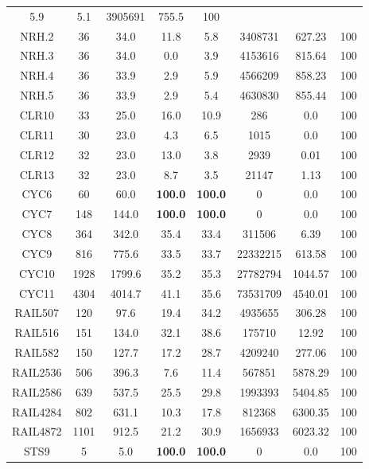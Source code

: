 \begin{longtable}{@{\extracolsep{5pt}}cccccccc}
			5.9
		&
			5.1
		& 3905691 & 755.5 & 100
	\\
	NRH.2 &
		36 & 34.0 &
			11.8
		&
			5.8
		& 3408731 & 627.23 & 100
	\\
	NRH.3 &
		36 & 34.0 &
			0.0
		&
			3.9
		& 4153616 & 815.64 & 100
	\\
	NRH.4 &
		36 & 33.9 &
			2.9
		&
			5.9
		& 4566209 & 858.23 & 100
	\\
	NRH.5 &
		36 & 33.9 &
			2.9
		&
			5.4
		& 4630830 & 855.44 & 100
	\\
	CLR10 &
		33 & 25.0 &
			16.0
		&
			10.9
		& 286 & 0.0 & 100
	\\
	CLR11 &
		30 & 23.0 &
			4.3
		&
			6.5
		& 1015 & 0.0 & 100
	\\
	CLR12 &
		32 & 23.0 &
			13.0
		&
			3.8
		& 2939 & 0.01 & 100
	\\
	CLR13 &
		32 & 23.0 &
			8.7
		&
			3.5
		& 21147 & 1.13 & 100
	\\
	CYC6 &
		60 & 60.0 &
			\textbf{100.0}
		&
			\textbf{100.0}
		& 0 & 0.0 & 100
	\\
	CYC7 &
		148 & 144.0 &
			\textbf{100.0}
		&
			\textbf{100.0}
		& 0 & 0.0 & 100
	\\
	CYC8 &
		364 & 342.0 &
			35.4
		&
			33.4
		& 311506 & 6.39 & 100
	\\
	CYC9 &
		816 & 775.6 &
			33.5
		&
			33.7
		& 22332215 & 613.58 & 100
	\\
	CYC10 &
		1928 & 1799.6 &
			35.2
		&
			35.3
		& 27782794 & 1044.57 & 100
	\\
	CYC11 &
		4304 & 4014.7 &
			41.1
		&
			35.6
		& 73531709 & 4540.01 & 100
	\\
	RAIL507 &
		120 & 97.6 &
			19.4
		&
			34.2
		& 4935655 & 306.28 & 100
	\\
	RAIL516 &
		151 & 134.0 &
			32.1
		&
			38.6
		& 175710 & 12.92 & 100
	\\
	RAIL582 &
		150 & 127.7 &
			17.2
		&
			28.7
		& 4209240 & 277.06 & 100
	\\
	RAIL2536 &
		506 & 396.3 &
			7.6
		&
			11.4
		& 567851 & 5878.29 & 100
	\\
	RAIL2586 &
		639 & 537.5 &
			25.5
		&
			29.8
		& 1993393 & 5404.85 & 100
	\\
	RAIL4284 &
		802 & 631.1 &
			10.3
		&
			17.8
		& 812368 & 6300.35 & 100
	\\
	RAIL4872 &
		1101 & 912.5 &
			21.2
		&
			30.9
		& 1656933 & 6023.32 & 100
	\\
	STS9 &
		5 & 5.0 &
			\textbf{100.0}
		&
			\textbf{100.0}
		& 0 & 0.0 & 100
	\\

\end{longtable}
